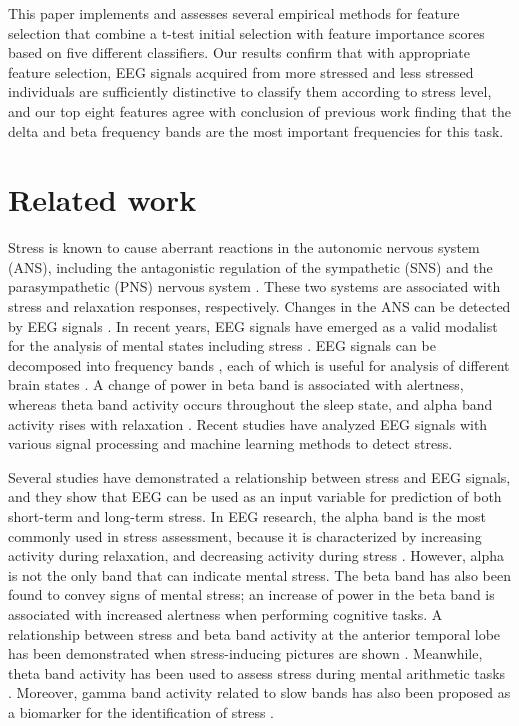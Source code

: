 \documentclass[pdflatex,sn-mathphys]{sn-jnl}%
\theoremstyle{thmstyleone}%
\theoremstyle{thmstyletwo}%
\theoremstyle{thmstylethree}%
\begin{document}

This paper implements and assesses several empirical methods for feature selection that combine a t-test initial selection with feature importance scores based on five different classifiers. Our results confirm that with appropriate feature selection, EEG signals acquired from more stressed and less stressed individuals are sufficiently distinctive to classify them according to stress level, and our top eight features agree with conclusion of previous work finding that the delta and beta frequency bands are the most important frequencies for this task.

\section{Related work} \label{sec2}
Stress is known to cause aberrant reactions in the autonomic nervous system (ANS), including the antagonistic regulation of the sympathetic (SNS) and the parasympathetic (PNS) nervous system \cite{Cohen2000, Hughes2000}. These two systems are associated with stress and relaxation responses, respectively. Changes in the ANS can be detected by EEG signals \cite{Seo2010}. In recent years, EEG signals have emerged as a valid modalist for the analysis of mental states including stress \cite{Awang2011, Hu2015}. EEG signals can be decomposed into frequency bands \cite{Kulkarni2020}, each of which is useful for analysis of different brain states \cite{Alshargie-2018}. A change of power in beta band is associated with alertness, whereas theta band activity occurs throughout the sleep state, and alpha band activity rises with relaxation \cite{Wang2014}. Recent studies have analyzed EEG signals with various signal processing and machine learning methods to detect stress.

Several studies have demonstrated a relationship between stress and EEG signals, and they show that EEG can be used as an input variable for prediction of both short-term and long-term stress. In EEG research, the alpha band is the most commonly used in stress assessment, because it is characterized by increasing activity during relaxation, and decreasing activity during stress \cite{Alshargie-2016}. However, alpha is not the only band that can indicate mental stress. The beta band has also been found to convey signs of mental stress; an increase of power in the beta band is associated with increased alertness when performing cognitive tasks. A relationship between stress and beta band activity at the anterior temporal lobe has been demonstrated when stress-inducing pictures are shown \cite{Seo2010, Awang2011, Hamid2010}. Meanwhile, theta band activity has been used to assess stress during mental arithmetic tasks \cite{Grtner2015}. Moreover, gamma band activity related to slow bands has also been proposed as a biomarker for the identification of stress \cite{Arsalan2019}.
\end{document}
